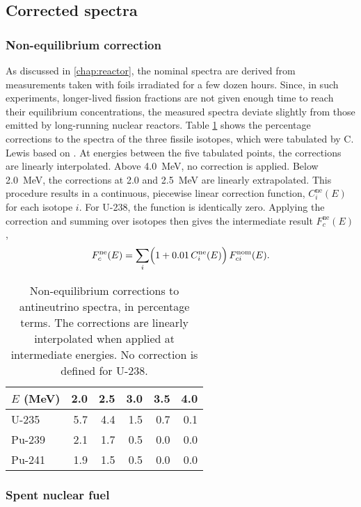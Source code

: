 \documentclass[../thesis.tex]{subfiles}
\begin{document}
\subsection{Corrected spectra}
\label{sec:corrspectra}

\subsubsection{Non-equilibrium correction}
\label{sec:noneqcorrspectra}

As discussed in \ref{chap:reactor}, the nominal spectra are derived from
measurements taken with foils irradiated for a few dozen hours. Since, in such
experiments, longer-lived fission fractions are not given enough time to reach
their equilibrium concentrations, the measured spectra deviate slightly from
those emitted by long-running nuclear reactors. Table \ref{tab:noneqcorr} shows
the percentage corrections to the spectra of the three fissile isotopes, which
were tabulated by C. Lewis \cite{Lewis} based on \cite{French}. At energies
between the five tabulated points, the corrections are linearly
interpolated. Above 4.0~MeV, no correction is applied. Below 2.0~MeV, the
corrections at 2.0 and 2.5~MeV are linearly extrapolated. This procedure results
in a continuous, piecewise linear correction function, $C^\mathrm{ne}_i(E)$ for
each isotope $i$. For U-238, the function is identically zero. Applying the
correction and summing over isotopes then gives the intermediate result
$F^\mathrm{ne}_c(E)$,
\[ F^\mathrm{ne}_c(E) = \sum_i \Bigl(1 + 0.01\, C^\mathrm{ne}_i(E)\Bigr)\,
  F^\mathrm{nom}_{ci}(E). \]

\begin{table}
  \centering
  \begin{tabular}{lrrrrr}
    \toprule
    $E$ (MeV) & 2.0 & 2.5 & 3.0 & 3.5 & 4.0 \\
    \midrule
    U-235 & 5.7 & 4.4 & 1.5 & 0.7 & 0.1 \\
    Pu-239 & 2.1 & 1.7 & 0.5 & 0.0 & 0.0 \\
    Pu-241 & 1.9 & 1.5 & 0.5 & 0.0 & 0.0 \\
    \bottomrule
  \end{tabular}
  \caption{Non-equilibrium corrections to antineutrino spectra, in percentage
    terms. The corrections are linearly interpolated when applied at
    intermediate energies. No correction is defined for U-238.}
  \label{tab:noneqcorr}
\end{table}

\subsubsection{Spent nuclear fuel}
\label{sec:snfcorrspectra}
\end{document}
